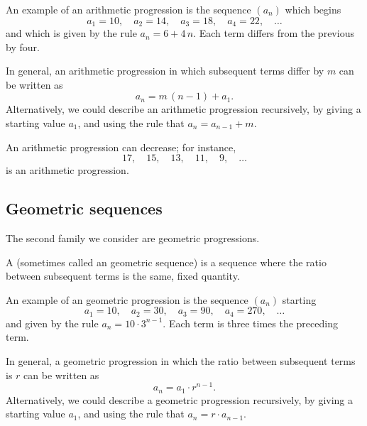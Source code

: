 \begin{example}
  An example of an arithmetic progression is the sequence $(a_n)$ which begins 
  $$
  a_1 = 10, \quad a_2 = 14, \quad a_3 = 18, \quad a_4 = 22, \quad\ldots
  $$
  and which is given by the rule $a_n = 6 + 4 \, n$.  Each term differs
  from the previous by four.
\end{example}

In general, an arithmetic progression in which subsequent terms differ
by $m$ can be written as
$$
a_n = m \, (n-1) + a_1.
$$
Alternatively, we could describe an arithmetic progression
recursively, by giving a starting value $a_1$, and using the rule that
$a_{n} = a_{n-1} + m$.


An arithmetic progression can decrease; for instance,
$$
17,\quad  15,\quad  13,\quad  11,\quad  9, \quad\ldots
$$
is an arithmetic progression.

\subsection{Geometric sequences}
\label{subsection:geometric-sequences}

The second family we consider are geometric progressions.

\begin{definition}
  A  (sometimes called an geometric
  sequence) is a sequence where the ratio
  between subsequent terms is the same, fixed quantity.
\end{definition}

\begin{example}
  An example of an geometric progression is the sequence $(a_n)$ starting
  $$
  a_1 = 10, \quad a_2 = 30, \quad a_3 = 90, \quad a_4 = 270, \quad\ldots
  $$
  and given by the rule $a_n = 10 \cdot 3^{n-1}$.  Each term is three
  times the preceding term.
\end{example}

In general, a geometric progression in which the ratio between
subsequent terms is $r$ can be written as
$$
a_n = a_1 \cdot r^{n-1}.
$$
Alternatively, we could describe a geometric progression
recursively, by giving a starting value $a_1$, and using the rule that
$a_{n} = r \cdot a_{n-1}$.

